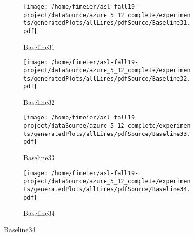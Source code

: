 \documentclass[11pt,a4paper]{article}
\begin{document}
\begin{figure}
	\begin{subfigure}[t]{.5\textwidth}
		\centering
		\texttt{[image: /home/fimeier/asl-fall19-project/dataSource/azure\_5\_12\_complete/experiments/generatedPlots/allLines/pdfSource/Baseline31.pdf]}
		\caption{Baseline31}
	\end{subfigure}
	\hfill
\begin{subfigure}[t]{0.5\textwidth}
		\centering
		\texttt{[image: /home/fimeier/asl-fall19-project/dataSource/azure\_5\_12\_complete/experiments/generatedPlots/allLines/pdfSource/Baseline32.pdf]}
		\caption{Baseline32}
	\end{subfigure}
	
	\medskip
	\begin{subfigure}[t]{.5\textwidth}
		\centering
		\texttt{[image: /home/fimeier/asl-fall19-project/dataSource/azure\_5\_12\_complete/experiments/generatedPlots/allLines/pdfSource/Baseline33.pdf]}
		\caption{Baseline33}
	\end{subfigure}
	\hfill
\begin{subfigure}[t]{.5\textwidth}
		\centering
		\texttt{[image: /home/fimeier/asl-fall19-project/dataSource/azure\_5\_12\_complete/experiments/generatedPlots/allLines/pdfSource/Baseline34.pdf]}
		\caption{Baseline34}
	\end{subfigure}
	
	\medskip
\end{figure}
\end{document}
